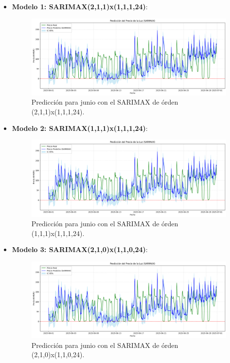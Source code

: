 \begin{itemize}
    \item \textbf{Modelo 1: SARIMAX(2,1,1)x(1,1,1,24)}:
    \begin{figure}[H]
    \centering
    \includegraphics[width=0.60\linewidth]{figuras/SARIMAX_pred21011024.png}
    \caption[Predicción SARIMAX (2,1,1)x(1,1,1,24)]{Predicción para junio con el SARIMAX de órden (2,1,1)x(1,1,1,24).}
    \label{SARIMAX (2,1,1)x(1,1,1,24)}
    \end{figure}


    \item \textbf{Modelo 2: SARIMAX(1,1,1)x(1,1,1,24)}:
    \begin{figure}[H]
    \centering
    \includegraphics[width=0.60\linewidth]{figuras/SARIMAX_pred21011024.png}
    \caption[Predicción SARIMAX (1,1,1)x(1,1,1,24)]{Predicción para junio con el SARIMAX de órden (1,1,1)x(1,1,1,24).}
    \label{SARIMAX (1,1,1)x(1,1,1,24)}
    \end{figure}


    \item \textbf{Modelo 3: SARIMAX(2,1,0)x(1,1,0,24)}: 
    \begin{figure}[H]
    \centering
    \includegraphics[width=0.60\linewidth]{figuras/SARIMAX_pred21011024.png}
    \caption[Predicción SARIMAX (2,1,0)x(1,1,0,24)]{Predicción para junio con el SARIMAX de órden (2,1,0)x(1,1,0,24).}
    \label{SARIMAX (2,1,0)x(1,1,0,24)}
    \end{figure}
    
 
\end{itemize}


